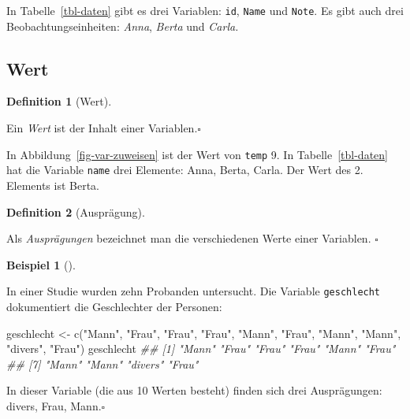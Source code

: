 \documentclass[
  a4paper,
]{scrbook}
\newenvironment{Shaded}{\begin{snugshade}}{\end{snugshade}}
\newcommand{\DocumentationTok}[1]{\textcolor[rgb]{0.37,0.37,0.37}{\textit{#1}}}
\newcommand{\FunctionTok}[1]{\textcolor[rgb]{0.28,0.35,0.67}{#1}}
\newcommand{\NormalTok}[1]{\textcolor[rgb]{0.00,0.23,0.31}{#1}}
\newcommand{\OtherTok}[1]{\textcolor[rgb]{0.00,0.23,0.31}{#1}}
\newcommand{\StringTok}[1]{\textcolor[rgb]{0.13,0.47,0.30}{#1}}
\theoremstyle{definition}
\newtheorem{example}{Beispiel}[chapter]
\theoremstyle{definition}
\newtheorem{definition}{Definition}[chapter]
\theoremstyle{definition}
\theoremstyle{remark}
\begin{document}
In Tabelle~\ref{tbl-daten} gibt es drei Variablen: \texttt{id},
\texttt{Name} und \texttt{Note}. Es gibt auch drei
Beobachtungseinheiten: \emph{Anna}, \emph{Berta} und \emph{Carla.}

\subsection{Wert}\label{wert}

\begin{definition}[Wert]\protect\hypertarget{def-wert}{}\label{def-wert}

Ein \emph{Wert} ist der Inhalt einer Variablen.\(\square\)

\end{definition}

In Abbildung~\ref{fig-var-zuweisen} ist der Wert von \texttt{temp} 9. In
Tabelle~\ref{tbl-daten} hat die Variable \texttt{name} drei Elemente:
Anna, Berta, Carla. Der Wert des 2. Elements ist Berta.

\begin{definition}[Ausprägung]\protect\hypertarget{def-auspraegung}{}\label{def-auspraegung}

Als \emph{Ausprägungen} bezeichnet man die verschiedenen Werte einer
Variablen. \(\square\)

\end{definition}

\begin{example}[]\protect\hypertarget{exm-geschlecht}{}\label{exm-geschlecht}

In einer Studie wurden zehn Probanden untersucht. Die Variable
\texttt{geschlecht} dokumentiert die Geschlechter der Personen:

\begin{Shaded}
\begin{Highlighting}[]
\NormalTok{geschlecht }\OtherTok{\textless{}{-}} \FunctionTok{c}\NormalTok{(}\StringTok{"Mann"}\NormalTok{, }\StringTok{"Frau"}\NormalTok{, }\StringTok{"Frau"}\NormalTok{, }\StringTok{"Frau"}\NormalTok{, }\StringTok{"Mann"}\NormalTok{,}
                \StringTok{"Frau"}\NormalTok{, }\StringTok{"Mann"}\NormalTok{, }\StringTok{"Mann"}\NormalTok{, }\StringTok{"divers"}\NormalTok{, }\StringTok{"Frau"}\NormalTok{)}
\NormalTok{geschlecht}
\DocumentationTok{\#\#  [1] "Mann"   "Frau"   "Frau"   "Frau"   "Mann"   "Frau"  }
\DocumentationTok{\#\#  [7] "Mann"   "Mann"   "divers" "Frau"}
\end{Highlighting}
\end{Shaded}

In dieser Variable (die aus 10 Werten besteht) finden sich drei
Ausprägungen: divers, Frau, Mann.\(\square\)

\end{example}
\end{document}
